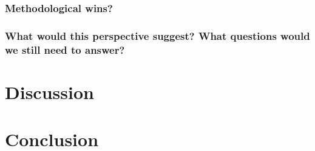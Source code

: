 \documentclass[main]{subfiles}
\begin{document}
\subsubsection{Methodological wins?}

\subsubsection{What would this perspective suggest? What questions would we still need to answer?}

\section{Discussion}
\section{Conclusion}



\onlyinsubfile{
  
  
}
\end{document}
